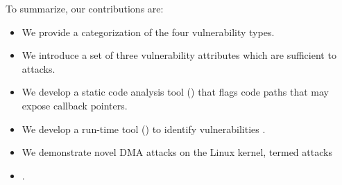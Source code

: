 To summarize, our contributions are:
\begin{itemize}
    \item We provide a categorization of the four \subpage{} vulnerability types.
    \item We introduce a set of three vulnerability attributes which are sufficient to \DIFdelbegin {}\DIFdelend \DIFaddbegin {}\DIFaddend attacks.
    \item We develop a static code analysis tool (\tool) that flags code paths that may expose callback pointers. 
    \item We develop a run-time tool (\dkasan) to identify \subpage{} vulnerabilities \DIFdelbegin {}\DIFdelend \DIFaddbegin {}\DIFaddend .
    \item We demonstrate novel DMA attacks on the Linux kernel, termed \compound{} attacks\DIFaddbegin {}\item {}\DIFaddend .
\end{itemize}



